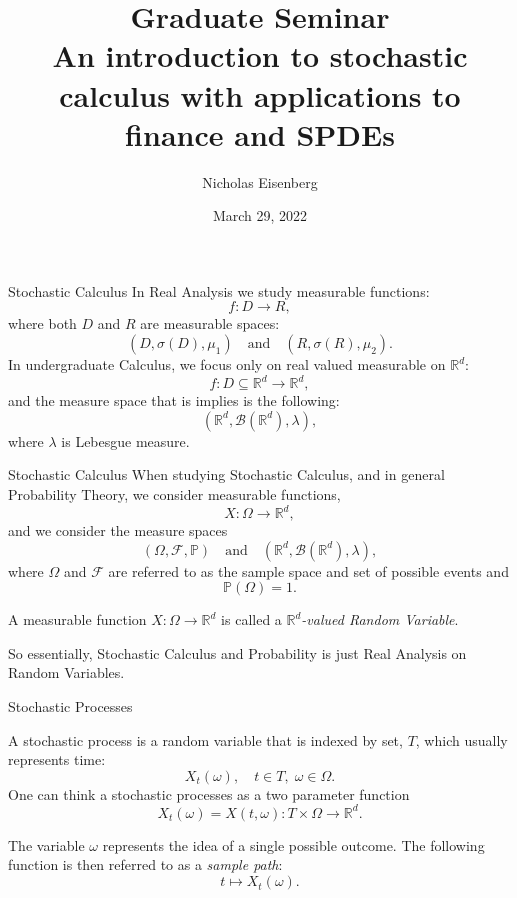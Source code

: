 \documentclass{beamer}%
\title[About Beamer] %
{Graduate Seminar \\
An introduction to stochastic calculus with applications to finance and SPDEs}
\author[Arthur, Doe] %
{Nicholas Eisenberg}
\date[VLC 2021] %
{ \small March 29, 2022 
}
\numberwithin{equation}{section}
\newcommand{\R}{\mathbb{R}}
\begin{document}
	\frame{\titlepage}	
	\setcounter{page}{1}

	\begin{frame}{Stochastic Calculus}
In Real Analysis we study measurable functions:
	\[
		f : D \to R,
	\]
where both $D$ and $R$ are measurable spaces:
	\[
		(D, \sigma(D), \mu_1) \quad \text{and} \quad (R, \sigma(R), \mu_2).
	\]
In undergraduate Calculus, we focus only on real valued measurable on $\R^d$:
	\[
		f : D \subseteq \R^d \to \R^d,
	\]
and the measure space that is implies is the following:
	\[
		(\R^d, \mathscr{B}(\R^d), \lambda),
	\]
where $\lambda$ is Lebesgue measure.
	\end{frame}

	\begin{frame}{Stochastic Calculus}
When studying Stochastic Calculus, and in general  Probability Theory, we consider measurable functions,
	\[
		X : \Omega \to \R^d,
	\]
and we consider the measure spaces 
	\[
		(\Omega, \mathcal{F}, \mathbb{P}) \quad \text{and} \quad (\R^d, \mathscr{B}(\R^d), \lambda),
	\]
where $\Omega$ and $\mathcal{F}$ are referred to as the sample space and set of possible events and
	\[
		\mathbb{P}(\Omega) = 1.
	\]
\begin{definition}
	A measurable function $X: \Omega \to \R^d$ is called a {\it $\R^d$-valued Random Variable}.
\end{definition}

So essentially, Stochastic Calculus and Probability is just Real Analysis on Random Variables. 
	\end{frame}

\begin{frame}{Stochastic Processes}
	\begin{definition}
A stochastic process is a random variable that is indexed by set, $T$, which usually represents time:
	\[
		X_t(\omega), \quad t \in T, \; \omega \in \Omega.
	\]
One can think a stochastic processes as a two parameter function
	\[
		X_t(\omega) = X(t,\omega): T \times \Omega \to \R^d.
	\]
	\end{definition}
	\begin{definition}
The variable $\omega$ represents the idea of a single possible outcome. The following function is then referred to as a {\it sample path}:
	\[
		t \mapsto X_t(\omega).
	\]
	\end{definition}

\end{frame}
\end{document}
